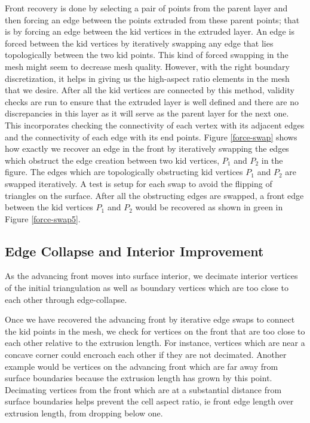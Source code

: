 \documentclass[conf]{new-aiaa}
\begin{document}
Front recovery is done by selecting a pair of points from the parent layer and then forcing an edge between the points extruded from these parent points; that is by forcing an edge between the kid vertices in the extruded layer. An edge is forced between the kid vertices by iteratively swapping any edge that lies topologically between the two kid points. This kind of forced swapping in the mesh might seem to decrease mesh quality. However, with the right boundary discretization, it helps in giving us the high-aspect ratio elements in the mesh that we desire. After all the kid vertices are connected by this method, validity checks are run to ensure that the extruded layer is well defined and there are no discrepancies in this layer as it will serve as the parent layer for the next one. This incorporates checking the connectivity of each vertex with its adjacent edges and the connectivity of each edge with its end points. Figure \ref{force-swap} shows how exactly we recover an edge in the front by iteratively swapping the edges which obstruct the edge creation between two kid vertices, $P_1$ and $P_2$ in the figure. The edges which are topologically obstructing kid vertices $P_1$ and $P_2$ are swapped iteratively. A test is setup for each swap to avoid the flipping of triangles on the surface. After all the obstructing edges are swapped, a front edge between the kid vertices $P_1$ and $P_2$ would be recovered as shown in green in Figure \ref{force-swap5}.

\subsection{Edge Collapse and Interior Improvement}

As the advancing front moves into surface interior, we decimate interior vertices of the initial triangulation as well as boundary vertices which are too close to each other through edge-collapse.

Once we have recovered the advancing front by iterative edge swaps to connect the kid points in the mesh, we check for vertices on the front that are too close to each other relative to the extrusion length. For instance, vertices which are near a concave corner could encroach each other if they are not decimated. Another example would be vertices on the advancing front which are far away from surface boundaries because the extrusion length has grown by this point. Decimating vertices from the front which are at a substantial distance from surface boundaries helps prevent the cell aspect ratio, ie front edge length over extrusion length, from dropping below one.
\end{document}
